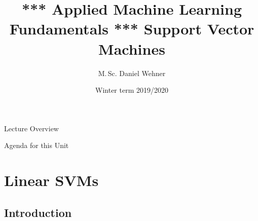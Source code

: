 


\title[Support Vector Machines]{*** Applied Machine Learning Fundamentals *** Support Vector Machines}
\author{M.\,Sc. Daniel Wehner}
\date{Winter term 2019/2020}




\maketitlepage


\begin{frame}{Lecture Overview}{}
\end{frame}


\begin{frame}{Agenda for this Unit}
	\begin{multicols}{2}
		\tableofcontents
	\end{multicols}
\end{frame}


\section{Linear SVMs}

\subsection{Introduction}

